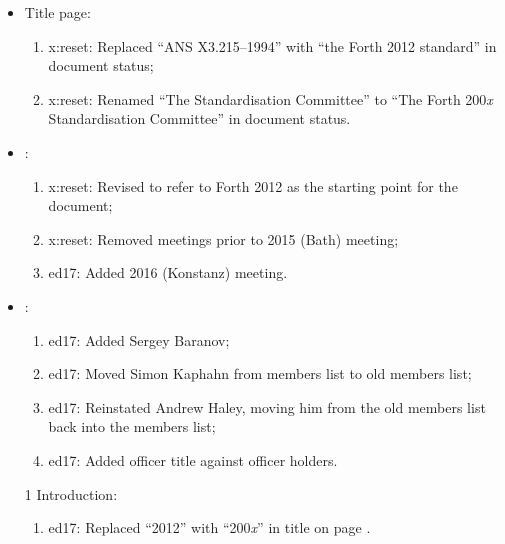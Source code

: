 	\begin{itemize}
	\item Title page:
		\begin{enumerate}
		\item \textsf{x:reset}: Replaced ``ANS X3.215--1994'' with ``the Forth 2012
			standard'' in document status;
		\item \textsf{x:reset}: Renamed ``The Standardisation Committee'' to ``The
			Forth 200\emph{x} Standardisation Committee'' in document status.
		\end{enumerate}

	\item {}:							%
		\begin{enumerate}
		\item \textsf{x:reset}: Revised to refer to Forth 2012 as the starting point
			for the document;
		\item \textsf{x:reset}: Removed meetings prior to 2015 (Bath) meeting;
		\item \textsf{ed17}: Added 2016 (Konstanz) meeting.
		\end{enumerate}

	\item {}:						%
		\begin{enumerate}
		\item \textsf{ed17}: Added Sergey Baranov;
		\item \textsf{ed17}: Moved Simon Kaphahn from members list to old members list;
		\item \textsf{ed17}: Reinstated Andrew Haley, moving him from the old members list back into the members list;
		\item \textsf{ed17}: Added officer title against officer holders.
		\end{enumerate}

	\item[1] Introduction:							%
		\begin{enumerate}
		\item \textsf{ed17}: Replaced ``2012'' with ``200\emph{x}'' in title on page \pageref{chap:intro}.
		\end{enumerate}


\end{itemize}
